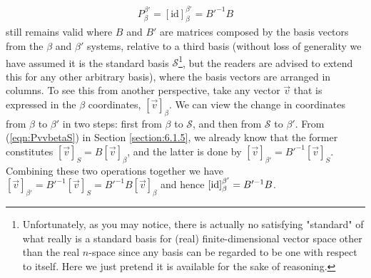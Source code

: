 \begin{align}
P_\beta^{\beta'} = [\text{id}]_\beta^{\beta'} = B'^{-1}B    
\end{align} still remains valid where $B$ and $B'$ are matrices composed by the basis vectors from the $\mathcal{\beta}$ and $\mathcal{\beta}'$ systems, relative to a third basis (without loss of generality we have assumed it is the standard basis $\mathcal{S}$\footnote{Unfortunately, as you may notice, there is actually no satisfying "standard" of what really is a standard basis for (real) finite-dimensional vector space other than the real $n$-space since any basis can be regarded to be one with respect to itself. Here we just pretend it is available for the sake of reasoning.}, but the readers are advised to extend this for any other arbitrary basis), where the basis vectors are arranged in columns. To see this from another perspective, take any vector $\vec{v}$ that is expressed in the $\mathcal{\beta}$ coordinates, $[\vec{v}]_\beta$. We can view the change in coordinates from $\mathcal{\beta}$ to $\mathcal{\beta}'$ in two steps: first from $\mathcal{\beta}$ to $\mathcal{S}$, and then from $\mathcal{S}$ to $\mathcal{\beta}'$. From (\ref{eqn:PvvbetaS}) in Section \ref{section:6.1.5}, we already know that the former constitutes $[\vec{v}]_S = B[\vec{v}]_\beta$, and the latter is done by $[\vec{v}]_{\beta'} = B'^{-1}[\vec{v}]_S$. Combining these two operations together we have $[\vec{v}]_{\beta'} = B'^{-1}[\vec{v}]_S = B'^{-1}B[\vec{v}]_\beta$ and hence $\smash{[\text{id}]_\beta^{\beta'}} = B'^{-1}B$.

